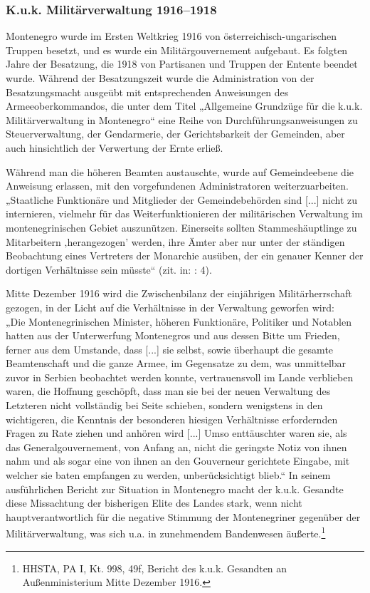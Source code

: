 \subsubsection{K.u.k. Militärverwaltung 1916–1918}

Montenegro wurde im Ersten Weltkrieg 1916 von österreichisch-ungarischen Truppen besetzt, und es wurde ein Militärgouvernement aufgebaut. Es folgten Jahre der Besatzung, die 1918 von Partisanen und Truppen der Entente beendet wurde. Während der Besatzungszeit wurde die Administration von der Besatzungsmacht ausgeübt mit entsprechenden Anweisungen des Armeeoberkommandos, die unter dem Titel „Allgemeine Grundzüge für die k.u.k. Militärverwaltung in Montenegro“ eine Reihe von Durchführungsanweisungen zu Steuerverwaltung, der Gendarmerie, der Gerichtsbarkeit der Gemeinden, aber auch hinsichtlich der Verwertung der Ernte erließ.\par
Während man die höheren Beamten austauschte, wurde auf Gemeindeebene die Anweisung erlassen, mit den vorgefundenen Administratoren weiterzuarbeiten. „Staatliche Funktionäre und Mitglieder der Gemeindebehörden sind [...] nicht zu internieren, vielmehr für das Weiterfunktionieren der militärischen Verwaltung im montenegrinischen Gebiet auszunützen. Einerseits sollten Stammeshäuptlinge zu Mitarbeitern ‚herangezogen’ werden, ihre Ämter aber nur unter der ständigen Beobachtung eines Vertreters der Monarchie ausüben, der ein genauer Kenner der dortigen Verhältnisse sein müsste“ (zit. in: \cite{scheer} : 4).\par
Mitte Dezember 1916 wird die Zwischenbilanz der einjährigen Militärherrschaft gezogen, in der Licht auf die Verhältnisse in der Verwaltung geworfen wird:\\
„Die Montenegrinischen Minister, höheren Funktionäre, Politiker und Notablen hatten aus der Unterwerfung Montenegros und aus dessen Bitte um Frieden, ferner aus dem Umstande, dass [...] sie selbst, sowie überhaupt die gesamte Beamtenschaft und die ganze Armee, im Gegensatze zu dem, was unmittelbar zuvor in Serbien beobachtet werden konnte, vertrauensvoll im Lande verblieben waren, die Hoffnung geschöpft, dass man sie bei der neuen Verwaltung des Letzteren nicht vollständig bei Seite schieben, sondern wenigstens in den wichtigeren, die Kenntnis der besonderen hiesigen Verhältnisse erfordernden Fragen zu Rate ziehen und anhören wird [...] Umso enttäuschter waren sie, als das Generalgouvernement, von Anfang an, nicht die geringste Notiz von ihnen nahm und als sogar eine von ihnen an den Gouverneur gerichtete Eingabe, mit welcher sie baten empfangen zu werden, unberücksichtigt blieb.“ In seinem ausführlichen Bericht zur Situation in Montenegro macht der k.u.k. Gesandte diese Missachtung der bisherigen Elite des Landes stark, wenn nicht hauptverantwortlich für die negative Stimmung der Montenegriner gegenüber der Militärverwaltung, was sich u.a. in zunehmendem Bandenwesen äußerte.\footnote{HHSTA, PA I, Kt. 998, 49f, Bericht des k.u.k. Gesandten an Außenministerium Mitte Dezember 1916.}\par

